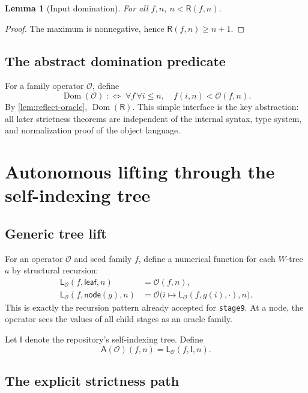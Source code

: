 \documentclass[11pt,oneside]{article}
\newtheorem{lemma}[theorem]{Lemma}
\theoremstyle{definition}
\newcommand{\Op}{\mathcal O}
\newcommand{\Index}{\mathsf I}
\newcommand{\Leaf}{\mathsf{leaf}}
\newcommand{\Node}{\mathsf{node}}
\newcommand{\Reflect}{\mathsf R}
\newcommand{\Lift}{\mathsf L}
\newcommand{\Auto}{\mathsf A}
\newcommand{\code}[1]{\texttt{#1}}
\begin{document}
\begin{lemma}[Input domination]\label{lem:reflect-input}
For all $f,n$, $n<\Reflect(f,n)$.
\end{lemma}
\begin{proof}
The maximum is nonnegative, hence
$\Reflect(f,n)\ge n+1$.
\end{proof}

\subsection{The abstract domination predicate}

For a family operator $\Op$, define
\begin{equation}\label{eq:dominates}
 \operatorname{Dom}(\Op)
 \;:\Longleftrightarrow\;
 \forall f\,\forall i\le n,\quad f(i,n)<\Op(f,n).
\end{equation}
By \cref{lem:reflect-oracle}, $\operatorname{Dom}(\Reflect)$.
This simple interface is the key abstraction: all later strictness theorems
are independent of the internal syntax, type system, and normalization proof
of the object language.

\section{Autonomous lifting through the self-indexing tree}

\subsection{Generic tree lift}

For an operator $\Op$ and seed family $f$, define a numerical function for
each $W$-tree $a$ by structural recursion:
\begin{align}
 \Lift_{\Op}(f,\Leaf,n)&=\Op(f,n),\label{eq:lift-leaf}\\
 \Lift_{\Op}(f,\Node(g),n)
   &=\Op\bigl(i\mapsto \Lift_{\Op}(f,g(i),\cdot),n\bigr).
   \label{eq:lift-node}
\end{align}
This is exactly the recursion pattern already accepted for
\code{stage9}.  At a node, the operator sees the values of all child stages as
an oracle family.

Let $\Index$ denote the repository's self-indexing tree.  Define
\begin{equation}\label{eq:auto}
 \Auto(\Op)(f,n)=\Lift_{\Op}(f,\Index,n).
\end{equation}

\subsection{The explicit strictness path}
\end{document}
